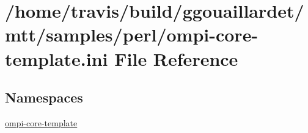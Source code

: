 \hypertarget{ompi-core-template_8ini}{\section{/home/travis/build/ggouaillardet/mtt/samples/perl/ompi-\/core-\/template.ini File Reference}
\label{ompi-core-template_8ini}
}
\subsection*{Namespaces}
\begin{DoxyCompactItemize}
\item 
\hyperlink{namespaceompi-core-template}{ompi-\/core-\/template}
\end{DoxyCompactItemize}
